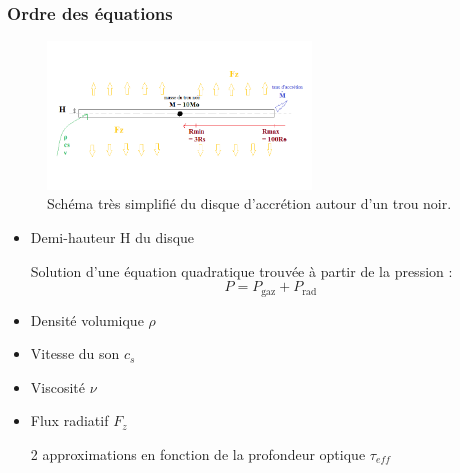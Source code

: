 \documentclass[french]{beamer}
\begin{document}

\begin{frame}
\frametitle{Ordre des équations}

   \begin{figure}[htb!]
      \includegraphics[width=7cm]{figures/bob_ross.png}
      \caption{Schéma très simplifié du disque d'accrétion autour d'un trou noir.}
   \end{figure}

   \begin{itemize}
      \item Demi-hauteur H du disque

      Solution d'une équation quadratique trouvée à partir de la pression :
      \begin{equation}
         P = P_\mathrm{gaz} + P_\mathrm{rad}
      \end{equation}
      
      \item Densité volumique $\rho$
      \item Vitesse du son $c_s$ 
      \item Viscosité $\nu$ 
      \item Flux radiatif $F_z$
      
      2 approximations en fonction de la profondeur optique $\tau_{eff}$
   \end{itemize}
\end{frame}


\end{document}
